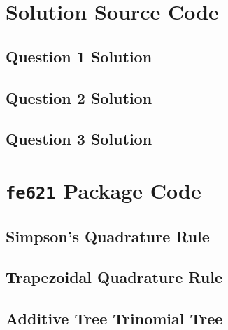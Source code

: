 \documentclass[10pt]{article}
\newcommand*\lstinputpath[1]{\lstset{inputpath=#1}} %
\begin{document}
\newpage

\printbibliography


\newpage

\appendix

\lstinputpath{}

\newpage
\section{Solution Source Code} \label{appendix:source}
    \subsection{Question 1 Solution} \label{appendix:source:q1}
        

    \subsection{Question 2 Solution} \label{appendix:source:q2}
        
    
    \subsection{Question 3 Solution} \label{appendix:source:q3}
        

\newpage
\section{\texttt{fe621} Package Code} \label{appendix:fe621}
\lstinputpath{..}
    \subsection{Simpson's Quadrature Rule} \label{appendix:fe621:simpsons}
        

    \subsection{Trapezoidal Quadrature Rule} \label{appendix:fe621:trapezoidal}
        

    \subsection{Additive Tree Trinomial Tree} \label{appendix:fe621:additivetree}
        
    
\end{document}
